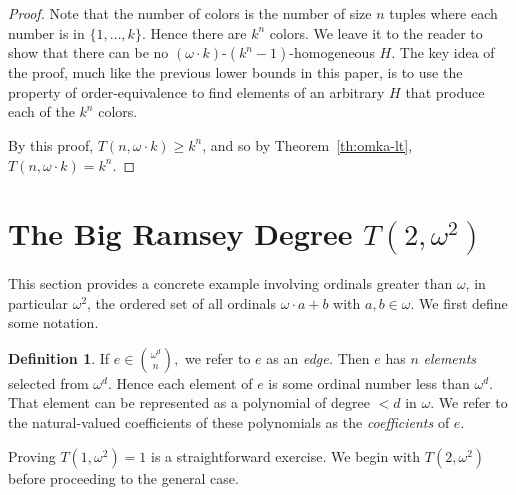\documentclass[11pt]{article}
\newcommand{\om}{\omega}
\newcommand{\numpoints}{n}
\theoremstyle{plain}
\theoremstyle{definition}
\newtheorem{definition}[theorem]{Definition}
\begin{document}
\begin{proof}
Note that the number of colors is the number of size $\numpoints$ tuples where each 
number is in $\{1,\ldots,k\}$. Hence there are $k^{\numpoints}$ colors.
We leave it to the reader to show that there can be no $(\om \cdot k)$-$(k^{\numpoints}-1)$-homogeneous $H$. The key idea of the proof, much like the previous lower bounds in this paper, is to use the property of order-equivalence to find elements of an arbitrary $H$ that produce each of the $k^{\numpoints}$ colors.

By this proof, $T(\numpoints,\om \cdot k) \geq k^{\numpoints}$, and so by Theorem~\ref{th:omka-lt}, $T(\numpoints,\om \cdot k) = k^{\numpoints}$.

\end{proof}


\section{The Big Ramsey Degree \texorpdfstring{$T(2,\om^2)$}{T(2, omega 2)}}\label{se:omega2} 

This section provides a concrete example involving ordinals greater than $\om$, in particular $\om^2$, the ordered set of all ordinals $\om\cdot a +b$ with $a,b \in \om$. We first define some notation.
\begin{definition} \label{def:coef}
If $e \in \binom{\om^d}{n},$ we refer to $e$ as an {\it edge.} Then $e$ has $n$ {\it elements} selected from $\om^d.$
Hence each element of $e$ is some ordinal number less than $\om^d.$ That element can be represented as a polynomial of degree $< d$ in $\omega.$ We refer to the natural-valued coefficients of these polynomials as the {\it coefficients} of $e.$
\end{definition}

Proving $T(1, \om^2) = 1$ is a straightforward exercise. We begin with $T(2, \om^2)$ before proceeding to the general case.
\end{document}
